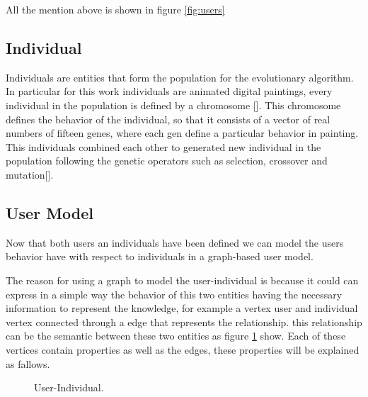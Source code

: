 All the mention above is shown in figure \ref{fig:users}

\subsection{Individual}  

Individuals are entities that form the population for the evolutionary
algorithm. In particular for  this work individuals are animated digital
paintings, every individual in the population is defined by a chromosome [].
This chromosome defines the behavior of the individual, so that it consists of a
vector of real numbers of fifteen genes, where each gen define a particular
behavior in painting. This individuals combined each other to generated new
individual in the population following the genetic operators such as selection,
crossover and mutation[]. 

\subsection{User Model} Now that both users an individuals have been defined we can
model the users behavior have with respect to individuals in a graph-based user
model.

The reason for using a graph to model the user-individual is because it could
can express in a simple way the behavior of this two entities having the
necessary information  to represent the knowledge,  for example a vertex user
and individual vertex connected through a edge that  represents the
relationship. this relationship can be the semantic  between these two entities
as figure \ref{fig:User-Individual} show. Each of these vertices contain properties as well as the
edges, these properties will be explained as fallows.

\begin{figure}
\captionsetup{justification=centering,margin=2cm}
\centering
\setlength\fboxsep{0pt}
\setlength\fboxrule{0.7pt}
\caption{User-Individual.}
\label{fig:User-Individual}       
\end{figure}

